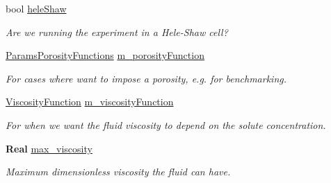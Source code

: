 \begin{DoxyCompactItemize}
\mbox{\label{class_mushy_layer_params_a55a2f43bc312f950f53d4e05dca51b55}} 
bool \hyperlink{class_mushy_layer_params_a55a2f43bc312f950f53d4e05dca51b55}{hele\+Shaw}
\begin{DoxyCompactList}\small\item\em Are we running the experiment in a Hele-\/\+Shaw cell? \end{DoxyCompactList}\item 
\mbox{\label{class_mushy_layer_params_a2b48c8871993e8d83577f794e51a979f}} 
\hyperlink{_mushy_layer_params_8h_aa4852525f865bc1315152f4690eeaaeb}{Params\+Porosity\+Functions} \hyperlink{class_mushy_layer_params_a2b48c8871993e8d83577f794e51a979f}{m\+\_\+porosity\+Function}
\begin{DoxyCompactList}\small\item\em For cases where want to impose a porosity, e.\+g. for benchmarking. \end{DoxyCompactList}\item 
\mbox{\label{class_mushy_layer_params_ab4584b1a17d87ac40ef334a87aa70903}} 
\hyperlink{_mushy_layer_params_8h_a81bb69f27935895243a77999d80e81bc}{Viscosity\+Function} \hyperlink{class_mushy_layer_params_ab4584b1a17d87ac40ef334a87aa70903}{m\+\_\+viscosity\+Function}
\begin{DoxyCompactList}\small\item\em For when we want the fluid viscosity to depend on the solute concentration. \end{DoxyCompactList}\item 
\textbf{ Real} \hyperlink{class_mushy_layer_params_a96533d7a2509a604830f5319163ca113}{max\+\_\+viscosity}
\begin{DoxyCompactList}\small\item\em Maximum dimensionless viscosity the fluid can have. \end{DoxyCompactList}\end{DoxyCompactItemize}

